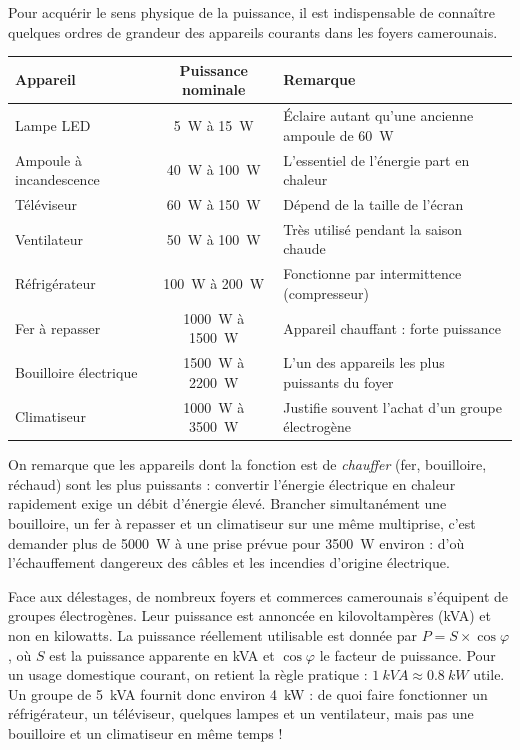 \documentclass[11pt]{article}
\newcommand{\cle}[1]{{\popxbold\color{popdark}#1}}
\begin{document}
Pour acquérir le sens physique de la puissance, il est indispensable de connaître quelques ordres de grandeur des appareils courants dans les foyers camerounais.

\begin{center}
\begin{tabularx}{\linewidth}{|l|c|X|}
\hline
\rowcolor{popblueL} \textbf{Appareil} & \textbf{Puissance nominale} & \textbf{Remarque} \\
\hline
Lampe LED & \SI{5}{W} à \SI{15}{W} & Éclaire autant qu'une ancienne ampoule de \SI{60}{W} \\
\hline
Ampoule à incandescence & \SI{40}{W} à \SI{100}{W} & L'essentiel de l'énergie part en chaleur \\
\hline
Téléviseur & \SI{60}{W} à \SI{150}{W} & Dépend de la taille de l'écran \\
\hline
Ventilateur & \SI{50}{W} à \SI{100}{W} & Très utilisé pendant la saison chaude \\
\hline
Réfrigérateur & \SI{100}{W} à \SI{200}{W} & Fonctionne par intermittence (compresseur) \\
\hline
Fer à repasser & \SI{1000}{W} à \SI{1500}{W} & Appareil chauffant : forte puissance \\
\hline
Bouilloire électrique & \SI{1500}{W} à \SI{2200}{W} & L'un des appareils les plus puissants du foyer \\
\hline
Climatiseur & \SI{1000}{W} à \SI{3500}{W} & Justifie souvent l'achat d'un groupe électrogène \\
\hline
\end{tabularx}
\end{center}

On remarque que les appareils dont la fonction est de \emph{chauffer} (fer, bouilloire, réchaud) sont les plus puissants : convertir l'énergie électrique en chaleur rapidement exige un débit d'énergie élevé. Brancher simultanément une bouilloire, un fer à repasser et un climatiseur sur une même multiprise, c'est demander plus de \SI{5000}{W} à une prise prévue pour \SI{3500}{W} environ : d'où l'échauffement dangereux des câbles et les incendies d'origine électrique.

\begin{savaistu}
Face aux délestages, de nombreux foyers et commerces camerounais s'équipent de groupes électrogènes. Leur puissance est annoncée en \cle{kilovoltampères} (kVA) et non en kilowatts. La puissance réellement utilisable est donnée par $P = S \times \cos\varphi$, où $S$ est la puissance apparente en kVA et $\cos\varphi$ le facteur de puissance. Pour un usage domestique courant, on retient la règle pratique : $\SI{1}{kVA} \approx \SI{0,8}{kW}$ utile. Un groupe de \SI{5}{kVA} fournit donc environ \SI{4}{kW} : de quoi faire fonctionner un réfrigérateur, un téléviseur, quelques lampes et un ventilateur, mais pas une bouilloire et un climatiseur en même temps !
\end{savaistu}
\end{document}
